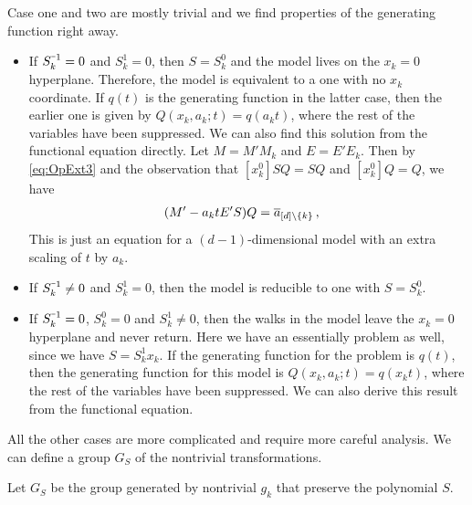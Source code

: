 \noindent Case one and two are mostly trivial and we find properties of the generating function right away.
\begin{itemize}
	\item[1.] If $S_k^{\um 1} = 0$ and $S_k^1 = 0$, then $S = S_k^0$ and the model lives on the $x_k = 0$ hyperplane. Therefore, the model is equivalent to a \lowD one with no $x_k$ coordinate. If $q(t)$ is the generating function in the latter case, then the earlier one is given by $Q(x_k, a_k;t) = q(a_kt)$, where the rest of the variables have been suppressed. We can also find this solution from the functional equation directly. Let $ M = M' M_k$ and $E = E' E_k$. Then by \autoref{eq:OpExt3} and the observation that $[x_k^0]SQ = SQ$ and $[x_k^0]Q = Q$, we have
	\begin{align}
		(M' - a_kt E' S)Q &= \overline{a}_{[d]\backslash \{k\}}\,,
	\end{align}
	This is just an equation for a $(d-1)$-dimensional model with an extra scaling of $t$ by $a_k$.
	\item[2.] If $S_k^{\um 1} \neq 0$ and $S_k^1 = 0$, then the model is reducible to one with $S = S_k^0$.
	\item[3.] If $S_k^{\um 1} = 0$, $S_k^0 = 0$ and $S_k^1 \neq 0$, then the walks in the model leave the $x_k = 0$ hyperplane and never return. Here we have an essentially \lowD problem as well, since we have $S = S_k^1 x_k$. If the generating function for the \lowD problem is $q(t)$, then the generating function for this model is $Q(x_k, a_k;t) = q(x_k t)$, where the rest of the variables have been suppressed. We can also derive this result from the functional equation.
\end{itemize}
All the other cases are more complicated and require more careful analysis. We can define a group $G_S$ of the nontrivial transformations.
\begin{defn} Let $G_S$ be the group generated by nontrivial $g_k$ that preserve the polynomial $S$.
\end{defn}

